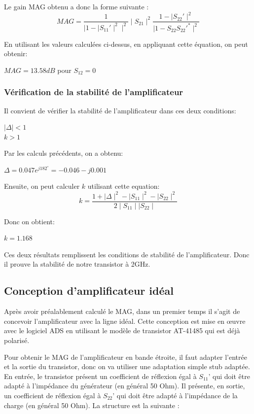 \documentclass[french]{article}
\begin{document}
Le gain MAG obtenu a donc la forme suivante :
\begin{equation}
	MAG=\frac{1}{\mid 1-\mid S_{11}'\mid^{2}\mid^{2}}\mid S_{21}\mid^{2}\frac{1-\mid S_{22}'\mid^{2}}{\mid 1-S_{22}S_{22}'^{\ast}\mid^{2}}
\end{equation}

En utilisant les valeurs calculées ci-dessus, en appliquant cette équation, on peut obtenir:

{\centering
	$MAG=13.58 dB$ pour $S_{12}=0$\\
}

\subsubsection{Vérification de la stabilité de l’amplificateur}
Il convient de vérifier la stabilité de l’amplificateur dans ces deux conditions:

{\centering
$\mid \Delta\mid<1$\\
$k>1$\\
}

Par les calculs précédents, on a obtenu:

{\centering
$\Delta=0.047e^{j182^{\circ}}=-0.046-j0.001$\\
}

Ensuite, on peut calculer $k$ utilisant cette equation:
\begin{equation}
	k=\frac{1+\mid \Delta\mid^{2}-\mid S_{11}\mid^{2}-\mid S_{22}\mid^{2}}{2\mid S_{11}\mid \mid S_{22}\mid}
\end{equation}

Donc on obtient:

{\centering
	$k=1.168$\\
}

Ces deux résultats remplissent les conditions de stabilité de l'amplificateur. Donc il prouve la stabilité de notre transistor à 2GHz.


\subsection{Conception d’amplificateur idéal}
Après avoir préalablement calculé le MAG, dans un premier temps il s’agit de concevoir l’amplificateur avec la ligne idéal. Cette conception est mise en œuvre avec le logiciel ADS en utilisant le modèle de transistor AT-41485 qui est déjà polarisé.

Pour obtenir le MAG de l’amplificateur en bande étroite, il faut adapter l’entrée et la sortie du transistor, donc on va utiliser une adaptation simple stub adaptée. En entrée, le transistor présent un coefficient de réflexion égal à $S_{11}’$ qui doit être adapté à l’impédance du générateur (en général 50 Ohm). Il présente, en sortie, un coefficient de réflexion égal à $S_{22}’$ qui doit être adapté à l’impédance de la charge (en général 50 Ohm). La structure est la suivante :
\end{document}

